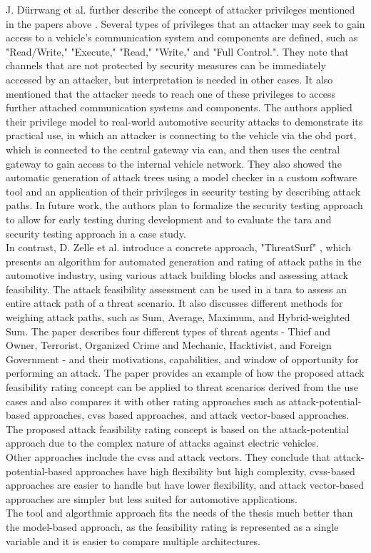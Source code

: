 J. Dürrwang et al. further describe the concept of attacker privileges mentioned in the papers above \cite{attacker_privileges}.
Several types of privileges that an attacker may seek to gain access to a vehicle's communication system and components are defined, such as "Read/Write," "Execute," "Read," "Write," and "Full Control.".
They note that channels that are not protected by security measures can be immediately accessed by an attacker, but interpretation is needed in other cases. 
It also mentioned that the attacker needs to reach one of these privileges to access further attached communication systems and components.
The authors applied their privilege model to real-world automotive security attacks to demonstrate its practical use, in which
an attacker is connecting to the vehicle via the \acrshort{obd} port, which is connected to the central gateway via \acrshort{can}, and then uses the central gateway to gain access to the internal vehicle network.
They also showed the automatic generation of attack trees using a model checker in a custom software tool and an application of their privileges in security testing by describing attack paths. 
In future work, the authors plan to formalize the security testing approach to allow for early testing during development and to evaluate the \acrshort{tara} and security testing approach in a case study.\\

In contrast, D. Zelle et al. introduce a concrete approach, "ThreatSurf" \cite{threat_surf}, which presents an algorithm for automated generation and rating of 
attack paths in the automotive industry, using various attack building blocks and assessing attack feasibility.
The attack feasibility assessment can be used in a \acrshort{tara} to assess an entire attack path of a threat scenario.
It also discusses different methods for weighing attack paths, such as Sum, Average, Maximum, and Hybrid-weighted Sum. 
The paper describes four different types of threat agents - Thief and Owner, Terrorist, Organized Crime and Mechanic, Hacktivist, and Foreign Government - 
and their motivations, capabilities, and window of opportunity for performing an attack. 
The paper provides an example of how the proposed attack feasibility rating concept can be applied to threat scenarios derived from the use cases and also 
compares it with other rating approaches such as attack-potential-based approaches, \acrshort{cvss} based approaches, and attack vector-based approaches.
The proposed attack feasibility rating concept is based on the attack-potential approach due to the complex nature of attacks against electric vehicles.\\
Other approaches include the \acrshort{cvss} and attack vectors.
They conclude that attack-potential-based approaches have high flexibility but high complexity, 
\acrshort{cvss}-based approaches are easier to handle but have lower flexibility, and attack vector-based approaches are simpler but less suited for automotive applications.\\
The tool and algorthmic approach fits the needs of the thesis much better than the model-based approach, as the feasibility rating is represented as a single variable and it is easier to compare multiple architectures.\\

